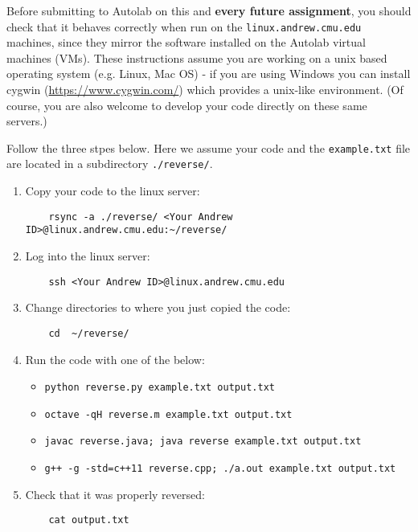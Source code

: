 \documentclass[12pt]{article}
\begin{document}
Before submitting to Autolab on this and \textbf{every future assignment}, you should check that it behaves correctly when run on the \texttt{linux.andrew.cmu.edu} machines, since they mirror the software installed on the Autolab virtual machines (VMs). These instructions assume you are working on a unix based operating system (e.g. Linux, Mac OS) - if you are using Windows you can install cygwin (\url{https://www.cygwin.com/}) which provides a unix-like environment. (Of course, you are also welcome to develop your code directly on these same servers.)

Follow the three stpes below. Here we assume your code and the \texttt{example.txt} file are located in a subdirectory \texttt{./reverse/}.

\begin{enumerate}
    \item Copy your code to the linux server:
    \begin{verbatim}
    rsync -a ./reverse/ <Your Andrew ID>@linux.andrew.cmu.edu:~/reverse/\end{verbatim}
    
    \item Log into the linux server:
    \begin{verbatim}
    ssh <Your Andrew ID>@linux.andrew.cmu.edu\end{verbatim}
    
    \item Change directories to where you just copied the code:
    \begin{verbatim}
    cd  ~/reverse/\end{verbatim}
    
    \item Run the code with one of the below:
    \begin{itemize}
        \item \texttt{python reverse.py example.txt output.txt}
        \item \texttt{octave -qH reverse.m example.txt output.txt}
        \item \texttt{javac reverse.java; java reverse example.txt output.txt}
        \item \texttt{g++ -g -std=c++11 reverse.cpp; ./a.out example.txt output.txt}
    \end{itemize}
    
    \item Check that it was properly reversed:
    \begin{verbatim}
    cat output.txt\end{verbatim}
\end{enumerate}
\end{document}
